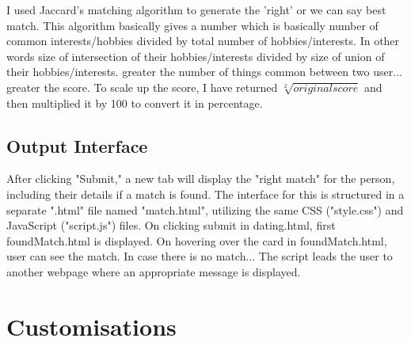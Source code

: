 \documentclass[12pt,a4paper]{article}
\begin{document}
I used Jaccard's matching algorithm to generate the 'right' or we can say best match. This algorithm basically gives a number which is basically number of common interests/hobbies divided by total number of hobbies/interests. In other words size of intersection of their hobbies/interests divided by size of union of their hobbies/interests. greater the number of things common between two user... greater the score. To scale up the score, I have returned $\sqrt[2]{ original score}$
and then multiplied it by 100 to convert it in percentage. \\

\subsection{Output Interface}

After clicking "Submit," a new tab will display the "right match" for the person, including their details if a match is found. The interface for this is structured in a separate ".html" file named "match.html", utilizing the same CSS ("style.css") and JavaScript ("script.js") files.
On clicking submit in dating.html, first foundMatch.html is displayed. On hovering over the card in foundMatch.html, user can see the match. In case there is no match... The script leads the user to another webpage where an appropriate message is displayed.

\section{Customisations}
\end{document}
